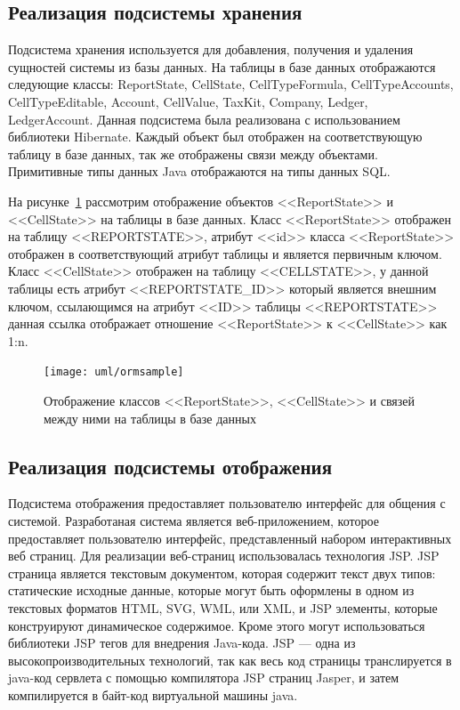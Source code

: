 \documentclass[14pt,a4paper]{reportmod}
\begin{document}
\subsection{Реализация подсистемы хранения}

Подсистема хранения используется для добавления, получения и удаления сущностей системы из базы данных. На таблицы в базе данных отображаются следующие классы: ReportState, CellState, CellTypeFormula, CellTypeAccounts, CellTypeEditable, Account, CellValue, TaxKit, Company, Ledger, LedgerAccount. Данная подсистема была реализована с использованием библиотеки Hibernate. Каждый объект был отображен на соответствующую таблицу в базе данных, так же отображены связи между объектами. Примитивные типы данных Java отображаются на типы данных SQL.

На рисунке~\ref{pic:ormsample} рассмотрим отображение объектов <<ReportState>> и\\ <<CellState>> на таблицы в базе данных. Класс <<ReportState>> отображен на таблицу <<REPORTSTATE>>, атрибут <<id>> класса <<ReportState>> отображен в соответствующий атрибут таблицы и является первичным ключом. Класс <<CellState>> отображен на таблицу <<CELLSTATE>>, у данной таблицы есть атрибут <<REPORTSTATE\_ID>> который является внешним ключом, ссылающимся на атрибут <<ID>> таблицы <<REPORTSTATE>> данная ссылка отображает отношение <<ReportState>> к <<CellState>> как 1:n.

\begin{figure}
  \centering
  \texttt{[image: uml/ormsample]}
  \caption{Отображение классов <<ReportState>>, <<CellState>> и связей между ними на таблицы в базе данных}
  \label{pic:ormsample}
\end{figure}


\subsection{Реализация подсистемы отображения}
Подсистема отображения предоставляет пользователю интерфейс для общения с системой. Разработаная система является веб-приложением, которое предоставляет пользователю интерфейс, представленный набором интерактивных веб страниц. Для реализации веб-страниц использовалась технология JSP. JSP страница является текстовым документом, которая содержит текст двух типов: статические исходные данные, которые могут быть оформлены в одном из текстовых форматов HTML, SVG, WML, или XML, и JSP элементы, которые конструируют динамическое содержимое. Кроме этого могут использоваться библиотеки JSP тегов для внедрения Java-кода. JSP --- одна из высокопроизводительных технологий, так как весь код страницы транслируется в java-код сервлета с помощью компилятора JSP страниц Jasper, и затем компилируется в байт-код виртуальной машины java.
\end{document}
